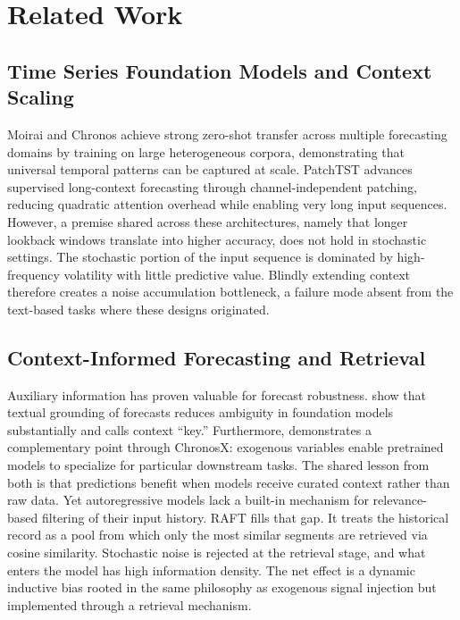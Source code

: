 \documentclass{article} %
\begin{document}
\section{Related Work}

\subsection{Time Series Foundation Models and Context Scaling}
Moirai \citep{woo2024unified} and Chronos \citep{ansari2024chronos} achieve strong zero-shot transfer across multiple forecasting domains by training on large heterogeneous corpora, demonstrating that universal temporal patterns can be captured at scale. PatchTST \citep{nie2023time} advances supervised long-context forecasting through channel-independent patching, reducing quadratic attention overhead while enabling very long input sequences. However, a premise shared across these architectures, namely that longer lookback windows translate into higher accuracy, does not hold in stochastic settings. The stochastic portion of the input sequence is dominated by high-frequency volatility with little predictive value. Blindly extending context therefore creates a noise accumulation bottleneck, a failure mode absent from the text-based tasks where these designs originated.

\subsection{Context-Informed Forecasting and Retrieval}
Auxiliary information has proven valuable for forecast robustness. \cite{williams2025context} show that textual grounding of forecasts reduces ambiguity in foundation models substantially and calls context ``key.'' Furthermore, \cite{arango2025chronosx} demonstrates a complementary point through ChronosX: exogenous variables enable pretrained models to specialize for particular downstream tasks. The shared lesson from both is that predictions benefit when models receive curated context rather than raw data. Yet autoregressive models lack a built-in mechanism for relevance-based filtering of their input history. RAFT fills that gap. It treats the historical record as a pool from which only the most similar segments are retrieved via cosine similarity. Stochastic noise is rejected at the retrieval stage, and what enters the model has high information density. The net effect is a dynamic inductive bias rooted in the same philosophy as exogenous signal injection but implemented through a retrieval mechanism.
\end{document}
